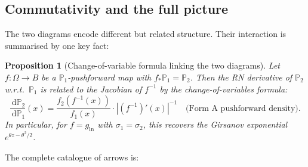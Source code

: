 \documentclass[11pt,a4paper]{article}
\newtheorem{proposition}{Proposition}
\newcommand{\dif}{\,\mathrm{d}}
\begin{document}
\subsection{Commutativity and the full picture}
\label{sec:commutativity}

The two diagrams encode different but related structure.  Their interaction is summarised by
one key fact:

\begin{proposition}[Change-of-variable formula linking the two diagrams]
Let $f:\Omega\to B$ be a $\mathbb{P}_1$-pushforward map with $f_*\mathbb{P}_1=\mathbb{P}_2$.
Then the RN derivative of $\mathbb{P}_2$ w.r.t.\ $\mathbb{P}_1$ is related to the Jacobian
of $f^{-1}$ by the change-of-variables formula:
\[
  \frac{\dif\mathbb{P}_2}{\dif\mathbb{P}_1}(x)
  =\frac{f_2(f^{-1}(x))}{f_1(x)}\cdot|(f^{-1})'(x)|^{-1}
  \quad\text{(Form~A pushforward density)}.
\]
In particular, for $f=g_{\ln}$ with $\sigma_1=\sigma_2$, this recovers the Girsanov
exponential $e^{\theta z-\theta^2/2}$.
\end{proposition}

\noindent The complete catalogue of arrows is:
\end{document}
